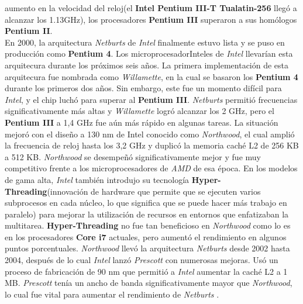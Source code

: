 aumento en la velocidad del reloj(el \textbf{Intel Pentium III-T Tualatin-256} llegó a alcanzar los 1.13GHz), los procesadores \textbf{Pentium III} superaron a sus 
homólogos \textbf{Pentium II}.\\ En 2000, la arquitectura \emph{Netburts} de \emph{Intel} finalmente estuvo lista y se puso en producción como \textbf{Pentium 4}. 
Los microprocesadorInteles de \emph{Intel} llevarían esta arquitecura durante los próximos seis años. La primera implementación de esta arquitecura fue nombrada como 
\emph{Willamette}, en la cual se basaron los \textbf{Pentium 4} durante los primeros dos años. Sin embargo, este fue un momento difícil para \emph{Intel}, y el chip luchó para 
superar al \textbf{Pentium III}. \emph{Netburts} permitió frecuencias significativamente más altas y \emph{Willamette} logró alcanzar los 2 GHz, pero el \textbf{Pentium III} 
a 1,4 GHz fue aún más rápido en algunas tareas. La situación mejoró con el diseño a 130 nm de Intel conocido como \emph{Northwood}, el cual  amplió la frecuencia 
de reloj hasta los 3,2 GHz y duplicó la memoria caché L2 de 256 KB a 512 KB. \emph{Northwood} se desempeñó significativamente mejor y fue muy competitivo frente a los microprocesadores 
de \emph{AMD} de esa época.
En los modelos de gama alta, \emph{Intel} también introdujo su tecnología \textbf{Hyper-Threading}(innovación de hardware que permite que se ejecuten varios subprocesos en cada núcleo, 
lo que significa que se puede hacer más trabajo en paralelo) para mejorar la utilización de recursos en entornos que 
enfatizaban la multitarea. \textbf{Hyper-Threading} no fue tan beneficioso en \emph{Northwood} como lo es en los procesadores \textbf{Core i7} actuales, 
pero aumentó el rendimiento en algunos puntos porcentuales.
\emph{Northwood} llevó la arquitectura \emph{Netburts} desde 2002 hasta 2004, después de lo cual \emph{Intel} lanzó \emph{Prescott} con numerosas mejoras. 
Usó un proceso de fabricación de 90 nm que permitió a \emph{Intel} aumentar la caché L2 a 1 MB.  \emph{Prescott} tenía un ancho de banda significativamente mayor que \emph{Northwood}, 
lo cual fue vital para aumentar el rendimiento de \emph{Netburts} .




